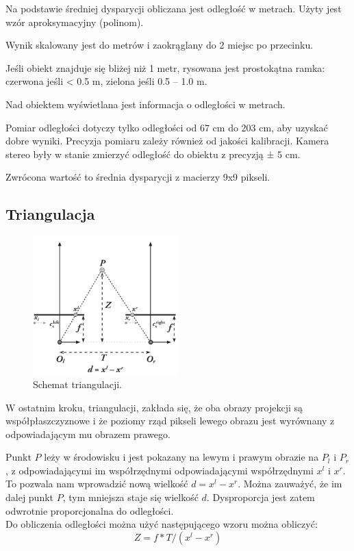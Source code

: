 \documentclass[magisterska]{pracadypl}
\begin{document}
Na podstawie średniej dysparycji obliczana jest odległość w metrach. Użyty jest wzór aproksymacyjny (polinom).

Wynik skalowany jest do metrów i zaokrąglany do 2 miejsc po przecinku.

Jeśli obiekt znajduje się bliżej niż 1 metr, rysowana jest prostokątna ramka: czerwona jeśli < 0.5 m, zielona jeśli 0.5 – 1.0 m.

Nad obiektem wyświetlana jest informacja o odległości w metrach.

Pomiar odległości dotyczy tylko odległości od 67 cm do 203 cm, aby uzyskać dobre wyniki. Precyzja pomiaru zależy również od jakości kalibracji. Kamera stereo były w stanie zmierzyć odległość do obiektu z precyzją ± 5 cm.

Zwrócona wartość to średnia dysparycji z macierzy 9x9 pikseli.

\subsection{Triangulacja}

\begin{figure}[H]  %
    \centering  %
    \includegraphics[width=0.5\textwidth]{images/triangulation.png}  %
    \captionsetup{font=footnotesize}
    \caption[Schemat triangulacji. Learning OpenCV 3, O'Reilly, Str. 705]{Schemat triangulacji.}
    \label{fig:rpi}  %
\end{figure}

W ostatnim kroku, triangulacji, zakłada się, że oba obrazy projekcji są współpłaszczyznowe i że poziomy rząd pikseli lewego obrazu jest wyrównany z odpowiadającym mu obrazem prawego.

Punkt $P$ leży w środowisku i jest pokazany na
lewym i prawym obrazie na $P_l$ i $P_r$, z odpowiadającymi im współrzędnymi
odpowiadającymi współrzędnymi $x^l$ i $x^r$. To pozwala nam wprowadzić nową wielkość $d = x^l - x^r$.
Można zauważyć, że im dalej punkt $P$, tym mniejsza staje się wielkość $d$. Dysproporcja jest zatem odwrotnie proporcjonalna do odległości.\\
Do obliczenia odległości można użyć następującego wzoru można obliczyć: \[Z=f*T/(x^l-x^r)\]
\end{document}
